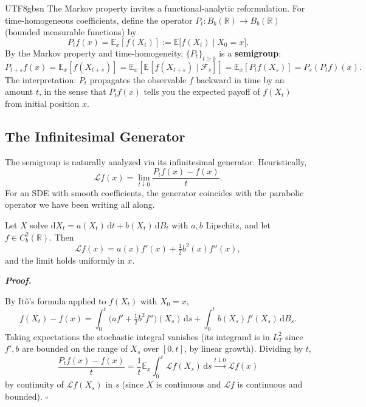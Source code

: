 \documentclass{article}
\newenvironment{proof}[1][Proof]{%
  \par\smallskip\noindent\textit{\textbf{#1.}}\quad\ignorespaces
}{%
  \hfill$\square$\par\smallskip
}
\begin{document}
\begin{CJK*}{UTF8}{gbsn}
The Markov property invites a functional-analytic reformulation. For time-homogeneous coefficients, define the operator $P_t:B_b(\mathbb{R})\to B_b(\mathbb{R})$ (bounded measurable functions) by
\[
  P_t f(x)=\mathbb{E}_x[f(X_t)]:=\mathbb{E}\bigl[f(X_t)\mid X_0=x\bigr].
\]
By the Markov property and time-homogeneity, $\{P_t\}_{t\ge 0}$ is a \textbf{semigroup}:
\[
  P_{t+s}f(x)=\mathbb{E}_x[f(X_{t+s})]=\mathbb{E}_x[\mathbb{E}[f(X_{t+s})\mid\mathcal{F}_s]]=\mathbb{E}_x[P_t f(X_s)]=P_s(P_t f)(x).
\]
The interpretation: $P_t$ propagates the observable $f$ backward in time by an amount $t$, in the sense that $P_t f(x)$ tells you the expected payoff of $f(X_t)$ from initial position $x$.

\subsection{The Infinitesimal Generator}

The semigroup is naturally analyzed via its infinitesimal generator. Heuristically,
\[
  \mathcal{L}f(x)=\lim_{t\downarrow 0}\frac{P_t f(x)-f(x)}{t}.
\]
For an SDE with smooth coefficients, the generator coincides with the parabolic operator we have been writing all along.

\begin{theorem}\label{thm:generator}
Let $X$ solve $\mathrm{d}X_t=a(X_t)\,\mathrm{d}t+b(X_t)\,\mathrm{d}B_t$ with $a,b$ Lipschitz, and let $f\in C^2_b(\mathbb{R})$. Then
\[
  \mathcal{L}f(x)=a(x)f'(x)+\tfrac{1}{2}b^2(x)f''(x),
\]
and the limit holds uniformly in $x$.
\end{theorem}

\begin{proof}
By It\^o's formula applied to $f(X_t)$ with $X_0=x$,
\[
  f(X_t)-f(x)=\int_0^t \bigl(a f'+\tfrac{1}{2}b^2 f''\bigr)(X_s)\,\mathrm{d}s+\int_0^t b(X_s)f'(X_s)\,\mathrm{d}B_s.
\]
Taking expectations the stochastic integral vanishes (its integrand is in $L^2_T$ since $f',b$ are bounded on the range of $X_s$ over $[0,t]$, by linear growth). Dividing by $t$,
\[
  \frac{P_tf(x)-f(x)}{t}=\frac{1}{t}\mathbb{E}_x\!\int_0^t\mathcal{L}f(X_s)\,\mathrm{d}s\xrightarrow{t\downarrow 0}\mathcal{L}f(x)
\]
by continuity of $\mathcal{L}f(X_s)$ in $s$ (since $X$ is continuous and $\mathcal{L}f$ is continuous and bounded).
\end{proof}

\begin{figure}[h]
\centering
{}
\end{figure}
\end{CJK*}
\end{document}

